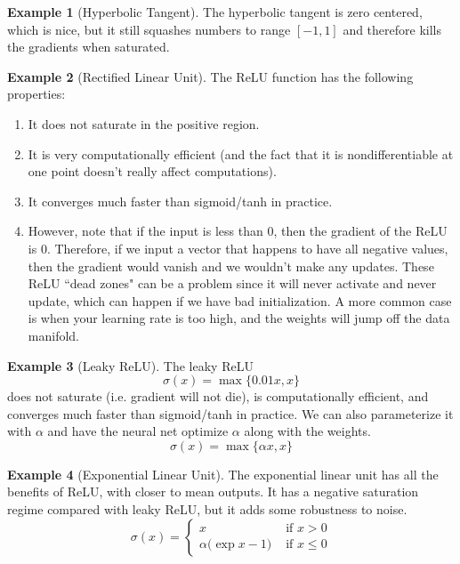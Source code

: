 \documentclass{article}
\theoremstyle{definition}
\newtheorem{example}{Example}[section]
\theoremstyle{remark}
\theoremstyle{definition}
\begin{document}
      \begin{example}[Hyperbolic Tangent]
      The hyperbolic tangent is zero centered, which is nice, but it still squashes numbers to range $[-1, 1]$ and therefore kills the gradients when saturated. 
      \end{example}

      \begin{example}[Rectified Linear Unit]
      The ReLU function has the following properties: 
      \begin{enumerate}
          \item It does not saturate in the positive region. 
          \item It is very computationally efficient (and the fact that it is nondifferentiable at one point doesn't really affect computations). 
          \item It converges much faster than sigmoid/tanh in practice. 
          \item However, note that if the input is less than $0$, then the gradient of the ReLU is $0$. Therefore, if we input a vector that happens to have all negative values, then the gradient would vanish and we wouldn't make any updates. These ReLU ``dead zones" can be a problem since it will never activate and never update, which can happen if we have bad initialization. A more common case is when your learning rate is too high, and the weights will jump off the data manifold. 
      \end{enumerate}
      \end{example}

      \begin{example}[Leaky ReLU]
      The leaky ReLU 
      \[\sigma(x) = \max\{0.01 x, x\}\]
      does not saturate (i.e. gradient will not die), is computationally efficient, and converges much faster than sigmoid/tanh in practice. We can also parameterize it with $\alpha$ and have the neural net optimize $\alpha$ along with the weights. 
      \[\sigma(x) = \max\{\alpha x, x\}\]
      \end{example}

      \begin{example}[Exponential Linear Unit]
      The exponential linear unit has all the benefits of ReLU, with closer to mean outputs. It has a negative saturation regime compared with leaky ReLU, but it adds some robustness to noise. 
      \[\sigma(x) = \begin{cases} x & \text{ if } x > 0 \\ \alpha \big(\exp{x} - 1 \big) & \text{ if } x \leq 0 \end{cases}\]
      \end{example}
\end{document}
